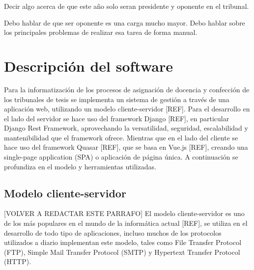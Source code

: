 Decir algo acerca de que este año solo seran presidente y oponente en el 
tribunal.

Debo hablar de que ser oponente es una carga mucho mayor.
Debo hablar sobre los principales problemas de realizar esa tarea 
de forma manual.







\section{Descripción del software}
Para la informatización de los procesos
de asignación de docencia y confección de los tribunales de tesis
se implementa 
un sistema de gestión a través de una aplicación web,
utilizando un modelo cliente-servidor [REF].
Para el desarrollo en el lado del servidor se hace uso del framework Django [REF], en particular Django Rest Framework, aprovechando la
versatilidad, seguridad, escalabilidad y mantenibilidad
que el framework ofrece.
Mientras que en el lado del cliente se hace uso
del framework Quasar [REF], que se basa en Vue.js [REF], creando una
single-page application (SPA) o aplicación de página única.
A continuación se profundiza en el modelo 
y herramientas utilizadas.

\subsection{Modelo cliente-servidor}
[VOLVER A REDACTAR ESTE PARRAFO]
El modelo cliente-servidor es uno de los más populares en
el mundo de la informática actual [REF], se utiliza en el 
desarrollo de todo tipo de aplicaciones, incluso muchos 
de los protocolos utilizados a diario implementan este modelo,
tales como File Transfer Protocol (FTP), Simple Mail Transfer Protocol
(SMTP) y Hypertext Transfer Protocol (HTTP).

